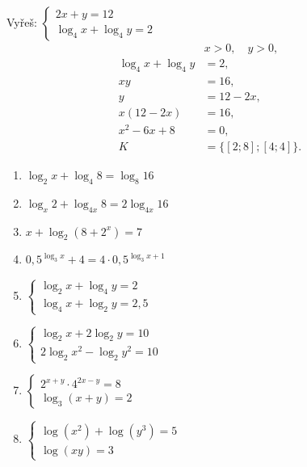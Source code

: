 \documentclass[11pt,a4paper]{article}
\begin{document}
\begin{prikladReseniBox}[title={Příklad 4}]
Vyřeš: $\displaystyle \begin{cases}2x+y=12\\\log_4x+\log_4y=2\end{cases}$
\tcblower
\[
\begin{aligned}
&x>0,\quad y>0,\\
\log_4 x+\log_4 y&=2,\\
xy&=16,\\
y&=12-2x,\\
x(12-2x)&=16,\\
x^2-6x+8&=0,\\
K&=\{[2;8];[4;4]\}.
\end{aligned}
\]
\end{prikladReseniBox}
\begin{zadaniBox}[title={Samostatná práce 1}]
\begin{enumerate}[label=\alph*)]
\item $\displaystyle \log_2 x+\log_4 8=\log_8 16$
\item $\displaystyle \log_x2+\log_{4x}8=2\log_{4x}16$
\item $\displaystyle x+\log_2(8+2^x)=7$
\item $\displaystyle 0{,}5^{\log_3 x}+4=4\cdot0{,}5^{\log_3x+1}$
\item $\displaystyle \begin{cases}\log_2 x+\log_4 y=2\\ \log_4 x+\log_2 y=2{,}5\end{cases}$
\item $\displaystyle \begin{cases}\log_2 x+2\log_2 y=10\\2\log_2 x^2-\log_2 y^2=10\end{cases}$
\item $\displaystyle \begin{cases}2^{x+y}\cdot4^{2x-y}=8\\\log_3(x+y)=2\end{cases}$
\item $\displaystyle \begin{cases}\log(x^2)+\log(y^3)=5\\\log(xy)=3\end{cases}$
\end{enumerate}
\end{zadaniBox}
\end{document}
